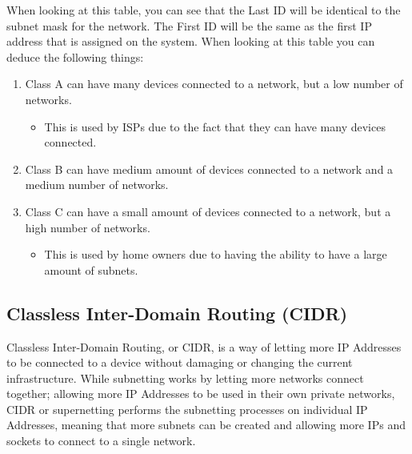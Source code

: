 \documentclass[a4paper,12pt]{article}
\begin{document}
    When looking at this table, you can see that the Last ID will be identical to the subnet mask for the network. The First ID will be the same as the first IP address that is assigned on the system. When looking at this table you can deduce the following things:
    \begin{enumerate}
	\item Class A can have many devices connected to a network, but a low number of networks.
	    \begin{itemize}
		\item This is used by ISPs due to the fact that they can have many devices connected.
	    \end{itemize}
	\item Class B can have medium amount of devices connected to a network and a medium number of networks.
	\item Class C can have a small amount of devices connected to a network, but a high number of networks.
	    \begin{itemize}
		\item This is used by home owners due to having the ability to have a large amount of subnets.
	    \end{itemize}
    \end{enumerate}

  \newline

  \subsection{Classless Inter-Domain Routing (CIDR)}
    Classless Inter-Domain Routing, or CIDR, is a way of letting more IP Addresses to be connected to a device without damaging or changing the current infrastructure. While subnetting works by letting more networks connect together; allowing more IP Addresses to be used in their own private networks, CIDR or supernetting performs the subnetting processes on individual IP Addresses, meaning that more subnets can be created and allowing more IPs and sockets to connect to a single network.
\end{document}
